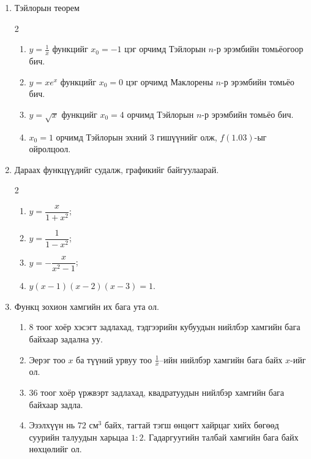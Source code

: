 \begin{enumerate}
\begin{multicols}{2}
\begin{enumerate}
\item $y = x + \sqrt{1 - x}$
\end{enumerate}
\end{multicols}
\item Тэйлорын теорем
\begin{multicols}{2}
\begin{enumerate}
\item $y = \frac{1}{x}$ функцийг $x_0=-1$ цэг орчимд Тэйлорын $n$-р эрэмбийн томьёогоор бич.

\item $y = xe^x$ функцийг $x_0=0$ цэг орчимд Маклорены $n$-р эрэмбийн томьёо бич.

\item $y = \sqrt{x}$ функцийг $x_0=4$ орчимд Тэйлорын $n$-р эрэмбийн томьёо бич.
\item $x_0=1$ орчимд Тэйлорын эхний 3 гишүүнийг олж, $f(1.03)$-ыг ойролцоол.
\end{enumerate}
\end{multicols}
\item Дараах функцүүдийг судалж, графикийг байгуулаарай.
\begin{multicols}{2}
\begin{enumerate}
  \item $y = \dfrac{x}{1+x^{2}}$;
  \item $y = \dfrac{1}{1-x^{2}}$;
  \item $y = -\dfrac{x}{x^{2}-1}$;
  \item $y(x-1)(x-2)(x-3)=1$.
\end{enumerate}
\end{multicols}
\item Функц зохион хамгийн их бага ута ол.
\begin{enumerate}


\item 8 тоог хоёр хэсэгт задлахад, тэдгээрийн кубуудын нийлбэр хамгийн бага байхаар задална уу.

\item Эерэг тоо $x$ ба түүний урвуу тоо $\frac{1}{x}$–ийн нийлбэр хамгийн бага байх $x$-ийг ол.

\item 36 тоог хоёр үржвэрт задлахад, квадратуудын нийлбэр хамгийн бага байхаар задла.

\item Эзэлхүүн нь $72\text{ см}^3$ байх, тагтай тэгш өнцөгт хайрцаг хийх бөгөөд суурийн талуудын харьцаа $1:2$. Гадаргуугийн талбай хамгийн бага байх нөхцөлийг ол.


\end{enumerate}
\end{enumerate}
